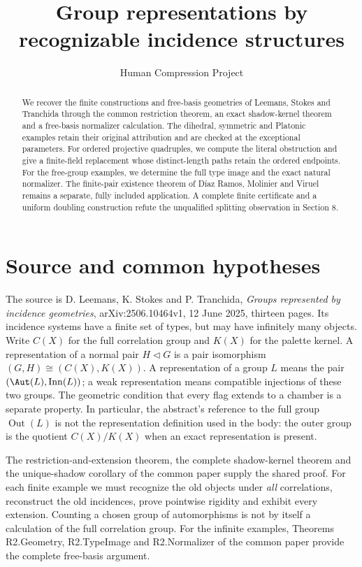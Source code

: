 
\title{Group representations by recognizable incidence structures}
\author{Human Compression Project}
\date{}

\maketitle
\begin{abstract}
We recover the finite constructions and free-basis geometries of Leemans,
Stokes and Tranchida through the common restriction theorem, an exact
shadow-kernel theorem and a free-basis normalizer calculation. The dihedral,
symmetric and Platonic examples retain their original attribution and are
checked at the exceptional parameters. For ordered projective quadruples,
we compute the literal obstruction and give a finite-field replacement
whose distinct-length paths retain the ordered endpoints. For the free-group examples, we determine the full type
image and the exact natural normalizer. The finite-pair existence theorem
of D\'iaz Ramos, Molinier and Viruel remains a separate, fully included
application. A complete finite certificate and a uniform doubling
construction refute the unqualified splitting observation in Section 8.
\end{abstract}

\section{Source and common hypotheses}
The source is D. Leemans, K. Stokes and P. Tranchida,
\emph{Groups represented by incidence geometries},
arXiv:2506.10464v1, 12 June 2025, thirteen pages. Its incidence systems
have a finite set of types, but may have infinitely many objects. Write
$C(X)$ for the full correlation group and $K(X)$ for the palette kernel.
A representation of a normal pair $H\lhd G$ is a pair isomorphism
$(G,H)\cong(C(X),K(X))$. A representation of a group $L$ means the pair
$(\Aut(L),\operatorname{Inn}(L))$; a weak representation means compatible
injections of these two groups. The geometric condition that every flag
extends to a chamber is a separate property. In particular, the abstract's
reference to the full group $\operatorname{Out}(L)$ is not the
representation definition used in the body: the outer group is the
quotient $C(X)/K(X)$ when an exact representation is present.

The restriction-and-extension theorem, the complete shadow-kernel theorem
and the unique-shadow corollary of the common paper supply the shared proof. For each finite example
we must recognize the old objects under \emph{all} correlations, reconstruct
the old incidences, prove pointwise rigidity and exhibit every extension.
Counting a chosen group of automorphisms is not by itself a calculation
of the full correlation group. For the infinite examples, Theorems
R2.Geometry, R2.TypeImage and R2.Normalizer of the common paper provide
the complete free-basis argument.







